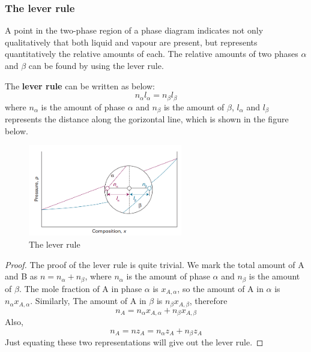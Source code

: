 \subsubsection{The lever rule}
A point in the two-phase region of a phase diagram indicates not only qualitatively that both liquid and vapour are present, but represents quantitatively the relative amounts of each.
The relative amounts of two phases $\alpha$ and $\beta$ can be found by using the lever rule.
\begin{theorem}
    The \textbf{lever rule} can be written as below:
    $$n_\alpha l_\alpha=n_\beta l_\beta$$
    where $n_\alpha$ is the amount of phase $\alpha$ and $n_\beta$ is the amount of $\beta$, $l_\alpha$ and $l_\beta$ represents the distance along the gorizontal line, which is shown in the figure below.
    \begin{figure}[H]
        \setlength{\abovecaptionskip}{0.5pt}
        \centering
        \includegraphics[width=0.6\textwidth]{"./fig/f3.png"}
        \caption{The lever rule}
    \end{figure}
\end{theorem}
\begin{proof}
    The proof of the lever rule is quite trivial. We mark the total amount of A and B as $n=n_\alpha+n_\beta$, where $n_\alpha$ is the amount of phase $\alpha$ and $n_\beta$ is the amount of $\beta$. The mole fraction of A in phase $\alpha$ is $x_{A,\alpha}$, so the amount of A in $\alpha$ is $n_\alpha x_{A,\alpha}$. Similarly, The amount of A in $\beta$ is $n_\beta x_{A,\beta}$, therefore
    $$n_A=n_\alpha x_{A,\alpha}+n_{\beta}x_{A,\beta}$$
    Also, 
    $$n_A=nz_A=n_\alpha z_A+n_\beta z_A$$
    Just equating these two representations will give out the lever rule.
\end{proof}
